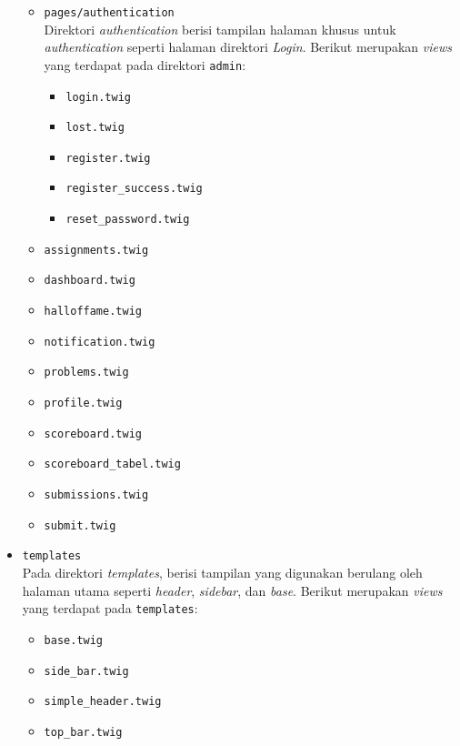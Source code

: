 \begin{itemize}
\begin{itemize}
		      \item \verb|pages/authentication| \\
		            Direktori \textit{authentication} berisi tampilan halaman khusus untuk \textit{authentication} seperti halaman direktori \textit{Login}. Berikut merupakan \textit{views} yang terdapat pada direktori \verb|admin|:

		            \begin{itemize}
			            \item \verb|login.twig|
			            \item \verb|lost.twig|
			            \item \verb|register.twig|
			            \item \verb|register_success.twig|
			            \item \verb|reset_password.twig|
		            \end{itemize}

		      \item \verb|assignments.twig|
		      \item \verb|dashboard.twig|
		      \item \verb|halloffame.twig|
		      \item \verb|notification.twig|
		      \item \verb|problems.twig|
		      \item \verb|profile.twig|
		      \item \verb|scoreboard.twig|
		      \item \verb|scoreboard_tabel.twig|
		      \item \verb|submissions.twig|
		      \item \verb|submit.twig|
	      \end{itemize}

	\item \verb|templates| \\
	      Pada direktori \textit{templates}, berisi tampilan yang digunakan berulang oleh halaman utama seperti \textit{header}, \textit{sidebar}, dan \textit{base}. Berikut merupakan \textit{views} yang terdapat pada \verb|templates|:

	      \begin{itemize}
		      \item \verb|base.twig|
		      \item \verb|side_bar.twig|
		      \item \verb|simple_header.twig|
		      \item \verb|top_bar.twig|
	      \end{itemize}

\end{itemize}

